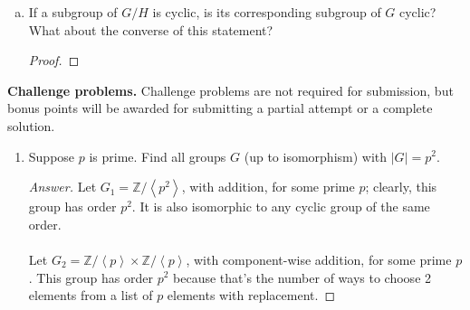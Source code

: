 \documentclass{article}
\newcommand{\bracks}[1]{\left\{#1\right\}}
\newcommand{\Z}{\mathbb{Z}}
\newcommand{\abracks}[1]{\left< #1\right>}
\begin{document}
\begin{enumerate}[(H1)]
\begin{enumerate}[(a)]
\begin{proof} We'll consider these implications separately, under 
the homomorphism $\varphi: G \to G/H$.\\\\
\textbf{Original Statement}:\\

\textbf{Converse}:\\
If $K \lhd G$, then is $\varphi(K) \lhd G/H$? If $K$ is a normal
subgroup of $G$, then for all $k \in K$ and $g \in G,\ gkg^{-1} \in K
$. From this, the image of $K$ under $\varphi$ is 
$$\varphi(K) = \bracks{\varphi(k)\ \big|\ k \in K}$$
and, by the properties of homomorphisms, for all $k \in K$ and 
$g \in G,\ \varphi(gkg^{-1}) = \varphi(g)\varphi(k)\varphi(g)^{-1}$. 
Since every element of the form $gkg^{-1} \in K$, it stands to reason
that $\varphi(g)\varphi(k)\varphi(g)^{-1} \in \varphi(K)$. 
So $\varphi(K)$ is a normal subgroup of $G/H$.
\end{proof}


\item 
If a subgroup of $G/H$ is cyclic, is its corresponding subgroup of $G
$ cyclic?  What about the converse of this statement?  

\begin{proof}

\end{proof}

\end{enumerate}

\end{enumerate}


\bigskip
\noindent
\textbf{Challenge problems.}
Challenge problems are not required for submission, but bonus points 
will be awarded for submitting a partial attempt or a complete 
solution.  

\begin{enumerate}[(C1)]
\item 
Suppose $p$ is prime.  Find all groups $G$ (up to isomorphism) with 
$|G| = p^2$.  

\begin{proof}[Answer]
Let $G_1 = \Z/\abracks{p^2}$, with addition, for some prime $p$; 
clearly, this group has order $p^2$. It is also isomorphic to any
cyclic group of the same order.\\\\
Let $G_2 = \Z/\abracks{p} \times \Z/\abracks{p}$, with 
component-wise addition,
for some prime $p$. This group has order $p^2$ because that's the
number of ways to choose 2 elements from a list of $p$ elements 
with replacement.
\end{proof}

\end{enumerate}
\noindent\makebox[\linewidth]{\rule{\paperwidth}{0.4pt}}
	
\end{document}
